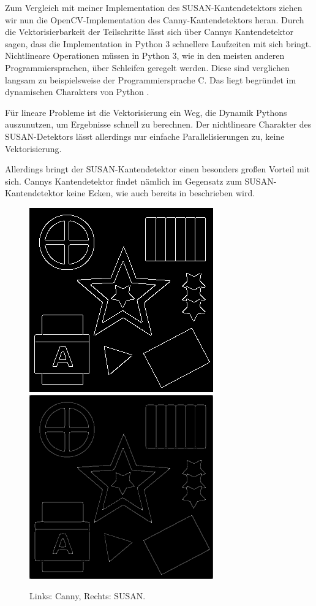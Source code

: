 \documentclass[a4paper, 11pt]{report}
\theoremstyle{definition}
\begin{document}
				Zum Vergleich mit meiner Implementation des SUSAN-Kantendetektors ziehen wir nun die OpenCV-Implementation des Canny-Kantendetektors heran. Durch die Vektorisierbarkeit der Teilschritte lässt sich über Cannys Kantendetektor sagen, dass die Implementation in Python 3 schnellere Laufzeiten mit sich bringt. Nichtlineare Operationen müssen in Python 3, wie in den meisten anderen Programmiersprachen, über Schleifen geregelt werden. Diese sind verglichen langsam zu beispielsweise der Programmiersprache C. Das liegt begründet im dynamischen Charakters von Python \cite{pyslow}.

				Für lineare Probleme ist die Vektorisierung ein Weg, die Dynamik Pythons auszunutzen, um Ergebnisse schnell zu berechnen. Der nichtlineare Charakter des SUSAN-Detektors lässt allerdings nur einfache Parallelisierungen zu, keine Vektorisierung.

				Allerdings bringt der SUSAN-Kantendetektor einen besonders großen Vorteil mit sich. Cannys Kantendetektor findet nämlich im Gegensatz zum SUSAN-Kantendetektor keine Ecken, wie auch bereits in \cite{SUSAN} beschrieben wird.

				\begin{figure}[H]\centering
					\includegraphics[width=.45\textwidth]{../examples/original/original-canny.png}\quad
					\includegraphics[width=.45\textwidth]{../examples/original/test_nonmax_supp.png}
					\caption{Links: Canny, Rechts: SUSAN.}
					\label{fig:canny_no_corners}
				\end{figure}
\end{document}
